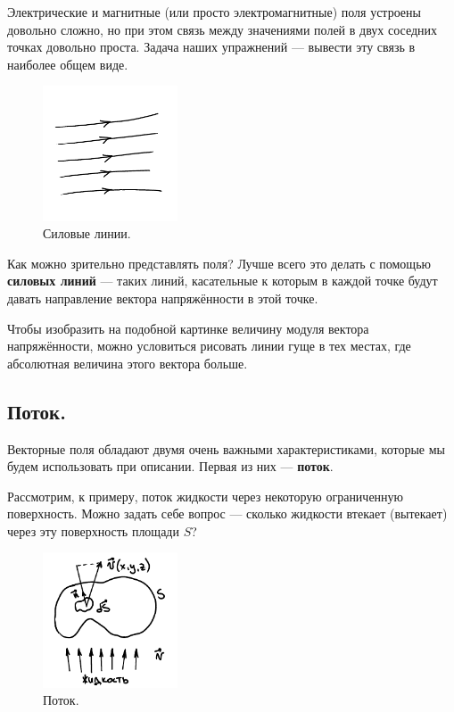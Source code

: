 \documentclass[12pt,a4paper]{article}
\numberwithin{equation}{section}
\numberwithin{equation}{section}
\begin{document}
Электрические и магнитные (или просто электромагнитные) поля устроены
довольно сложно, но при этом связь между значениями полей в двух
соседних точках довольно проста. Задача наших упражнений --- вывести
эту связь в наиболее общем виде. 

\begin{figure}
  \vspace{-1.5cm}
  \begin{center}
  \includegraphics[width=4cm]{lines.pdf}  
  \end{center}
  \vspace{-1cm}
  \caption{Силовые линии.}
  \label{fig:force_lines}
  \vspace{-1.1cm}
\end{figure}

Как можно зрительно представлять поля? Лучше всего это делать с
помощью \textbf{силовых линий} --- таких линий, касательные к которым в
каждой точке будут давать направление вектора напряжённости в этой
точке. 

Чтобы изобразить на подобной картинке величину модуля вектора
напряжённости, можно условиться рисовать линии гуще в тех местах, где
абсолютная величина этого вектора больше. 

\subsection{Поток.}
\label{sec:flux}

Векторные поля обладают двумя очень важными характеристиками, которые
мы будем использовать при описании. Первая из них --- \textbf{поток}. 

Рассмотрим, к примеру, поток жидкости через некоторую ограниченную
поверхность. Можно задать себе вопрос --- сколько жидкости втекает
(вытекает) через эту поверхность площади $S$? 

\begin{figure}
  \vspace{-0.8cm}
  \begin{center}
    \includegraphics[width=4cm,height=4cm]{flux.pdf}
  \end{center}
  \vspace{-0.7cm}
  \caption{Поток.}
  \label{fig:flux}
\end{figure}
\end{document}
